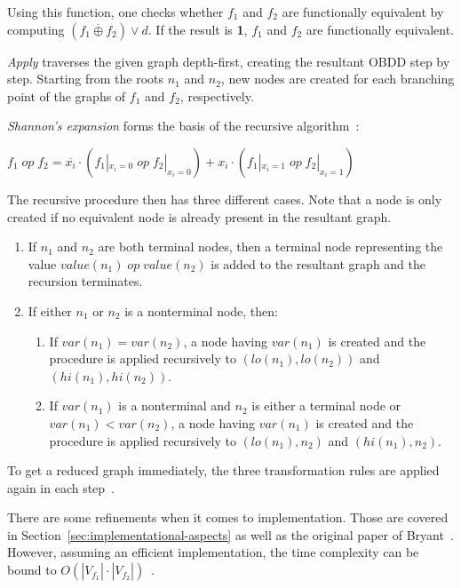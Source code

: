 \documentclass{vldb}
\begin{document}
\noindent
Using this function, one checks whether $f_1$ and $f_2$ are functionally
equivalent by computing $(f_1\overline{\oplus}f_2)\lor d$. If the result is
\textbf{1}, $f_1$ and $f_2$ are functionally equivalent.

\textit{Apply} traverses the given graph depth-first, creating the resultant OBDD
step by step. Starting from the roots $n_1$ and $n_2$, new nodes are created for
each branching point of the graphs of $f_1$ and $f_2$, respectively.

\textit{Shannon's expansion} forms the basis of the recursive
algorithm~\cite{BRYANT86}:
\begin{center}
$
f_1\;op\;f_2 =
\overline{x_i} \cdot \left(f_1|_{x_i=0}\;op\;f_2|_{x_i=0}\right)
+ x_i \cdot \left(f_1|_{x_i=1}\;op\;f_2|_{x_i=1}\right)
$
\end{center}

\noindent
The recursive procedure then has three different cases. Note that a node is only
created if no equivalent node is already present in the resultant graph.
\begin{enumerate}
    \item{
        If $n_1$ and $n_2$ are both terminal nodes, then a terminal node
        representing the value $value(n_1)\;op\;value(n_2)$ is added to the
        resultant graph and the recursion terminates.
    }
    \item{
        If either $n_1$ or $n_2$ is a nonterminal node, then:
        \begin{enumerate}
            \item{
                If $var(n_1) = var(n_2)$, a node having $var(n_1)$ is created and
                the procedure is applied recursively to $(lo(n_1), lo(n_2))$ and
                $(hi(n_1), hi(n_2))$.
            }
            \item{
                If $var(n_1)$ is a nonterminal and $n_2$ is either a terminal node
                or $var(n_1) < var(n_2)$, a node having $var(n_1)$ is created and
                the procedure is applied recursively to $(lo(n_1), n_2)$ and
                $(hi(n_1), n_2)$.
            }
        \end{enumerate}
    }
\end{enumerate}

To get a reduced graph immediately, the three transformation rules are applied
again in each step~\cite{BRYANT92}.

There are some refinements when it comes to implementation. Those are covered in
Section~\ref{sec:implementational-aspects} as well as the original paper of
Bryant~\cite{BRYANT86, BRYANT92}.  However, assuming an efficient implementation,
the time complexity can be bound to
$O\left(|V_{f_1}| \cdot |V_{f_2}|\right)$~\cite{BRYANT86, BRYANT92}.
\end{document}
